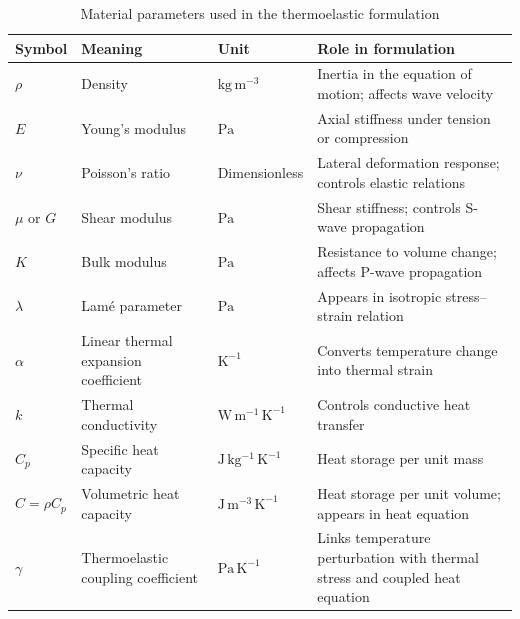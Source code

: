 \begin{table}[H]
\vspace*{-5mm}
\centering
\small
\caption{Material parameters used in the thermoelastic formulation}
\label{tab:material_parameters}
\begin{tabular}{p{}|p{}|p{}|p{}}
\hline
Symbol & Meaning & Unit & Role in formulation \\
\hline
\(\rho\) & Density & \(\mathrm{kg\,m^{-3}}\) & Inertia in the equation of motion; affects wave velocity \\
\hline
\(E\) & Young's modulus & \(\mathrm{Pa}\) & Axial stiffness under tension or compression \\
\hline
\(\nu\) & Poisson's ratio & Dimensionless & Lateral deformation response; controls elastic relations \\
\hline
\(\mu\) or \(G\) & Shear modulus & \(\mathrm{Pa}\) & Shear stiffness; controls S-wave propagation \\
\hline
\(K\) & Bulk modulus & \(\mathrm{Pa}\) & Resistance to volume change; affects P-wave propagation \\
\hline
\(\lambda\) & Lamé parameter & \(\mathrm{Pa}\) & Appears in isotropic stress--strain relation \\
\hline
\(\alpha\) & Linear thermal expansion coefficient & \(\mathrm{K^{-1}}\) & Converts temperature change into thermal strain \\
\hline
\(k\) & Thermal conductivity & \(\mathrm{W\,m^{-1}\,K^{-1}}\) & Controls conductive heat transfer \\
\hline
\(C_p\) & Specific heat capacity & \(\mathrm{J\,kg^{-1}\,K^{-1}}\) & Heat storage per unit mass \\
\hline
\(C=\rho C_p\) & Volumetric heat capacity & \(\mathrm{J\,m^{-3}\,K^{-1}}\) & Heat storage per unit volume; appears in heat equation \\
\hline
\(\gamma\) & Thermoelastic coupling coefficient & \(\mathrm{Pa\,K^{-1}}\) & Links temperature perturbation with thermal stress and coupled heat equation \\
\hline
\end{tabular}
\end{table}
